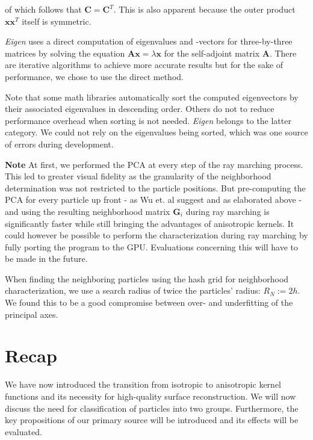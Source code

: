 of which follows that $\textbf{C} = \textbf{C}^T$. This is also apparent because the outer product $\textbf{x} \textbf{x}^T$ itself is symmetric.

\textit{Eigen} uses a direct computation of eigenvalues and -vectors for three-by-three matrices by solving the equation $\textbf{A} \textbf{x} = \lambda \textbf{x}$ for the self-adjoint matrix $\textbf{A}$. There are iterative algorithms to achieve more accurate results but for the sake of performance, we chose to use the direct method.

Note that some math libraries automatically sort the computed eigenvectors by their associated eigenvalues in descending order. Others do not to reduce performance overhead when sorting is not needed. \textit{Eigen} belongs to the latter category. We could not rely on the eigenvalues being sorted, which was one source of errors during development.

\textbf{Note } At first, we performed the PCA at every step of the ray marching process. This led to greater visual fidelity as the granularity of the neighborhood determination was not restricted to the particle positions. But pre-computing the PCA for every particle up front - as Wu et. al suggest and as elaborated above - and using the resulting neighborhood matrix $\textbf{G}_i$ during ray marching is significantly faster while still bringing the advantages of anisotropic kernels. It could however be possible to perform the characterization during ray marching by fully porting the program to the GPU. Evaluations concerning this will have to be made in the future.

When finding the neighboring particles using the hash grid for neighborhood characterization, we use a search radius of twice the particles' radius: $R_N := 2h$. We found this to be a good compromise between over- and underfitting of the principal axes.

\section{Recap}

We have now introduced the transition from isotropic to anisotropic kernel functions and its necessity for high-quality surface reconstruction. We will now discuss the need for classification of particles into two groups. Furthermore, the key propositions of our primary source will be introduced and its effects will be evaluated.
